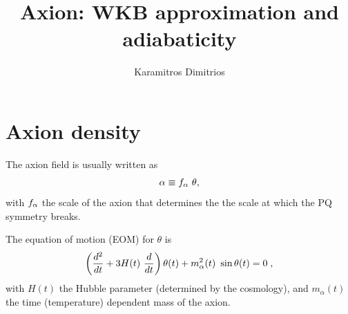 \documentclass[11pt,a4paper]{article}
\author{Karamitros Dimitrios}
\title{Axion: WKB approximation and adiabaticity}
\begin{document}
\maketitle





\section{Axion density}\label{sec:density}
\setcounter{equation}{0}
%
The axion field is usually written as 
%
\begin{equation}
	\alpha  \equiv f_{\alpha}{} \ \theta,
	\label{eq:fa_def}
\end{equation}
%
with $f_{\alpha}{}$ the scale of the axion that determines the the scale at which the PQ symmetry breaks. 

The equation of motion (EOM) for $\theta$ is 
%
\begin{equation}
	\lrb{\dfrac{d^2}{d t} + 3 H(t) \ \dfrac{d}{d t} } \theta(t) + m_{\alpha}^2(t) \ \sin \theta(t) = 0 \; ,
	\label{eq:eom}
\end{equation}
%
with $H(t)$ the Hubble parameter (determined by the cosmology), and $m_{\alpha}(t)$  the time (temperature) dependent mass of the axion. 
\end{document}

